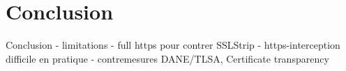 \section{Conclusion}
\begin{frame}{Conclusion}
  - limitations
  - full https pour contrer SSLStrip
  - https-interception difficile en pratique
  - contremesures DANE/TLSA, Certificate transparency
\end{frame}
